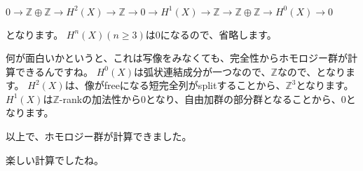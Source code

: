 \documentclass{ujarticle}
\begin{document}
$ 0 \to \mathbb{Z} \oplus \mathbb{Z} \to H^2( X) \to \mathbb{Z} \to 0
\to H^1(X) \to \mathbb{Z} \to \mathbb{Z} \oplus \mathbb{Z} \to H^0(X) \to 0$

となります。
$H^n(X)(n \ge 3)$は$0$になるので、省略します。

何が面白いかというと、これは写像をみなくても、完全性からホモロジー群が計算できるんですね。
$H^0(X)$は弧状連結成分が一つなので、$\mathbb{Z}$なので、となります。
$H^2(X)$は、像がfreeになる短完全列がsplitすることから、$\mathbb{Z}^3$となります。
$H^1(X)$は$\mathbb{Z}$-rankの加法性から0となり、自由加群の部分群となることから、$0$となります。

以上で、ホモロジー群が計算できました。

楽しい計算でしたね。
\end{document}
